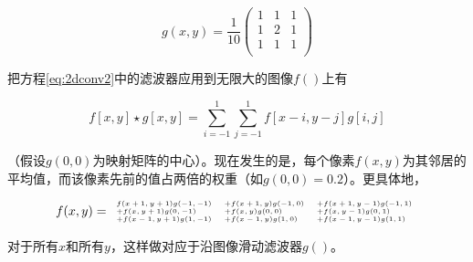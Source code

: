 \begin{equation}
g(x,y)=\frac{1}{10}
\left(
\begin{array}{ccc}
1 & 1 & 1\\
1 & 2 & 1\\
1 & 1 & 1\\
\end{array}
\right)
\end{equation}


把方程\ref{eq:2dconv2}中的滤波器应用到无限大的图像$f()$上有

\begin{equation}\label{eq:2dconv3}
f[x,y]\star g[x,y]=\sum_{i=-1}^{1}\sum_{j=-1}^{1}f[x-i,y-j]g[i,j]
\end{equation}

（假设$g(0,0)$为映射矩阵的中心）。现在发生的是，每个像素$f(x,y)$为其邻居的平均值，而该像素先前的值占两倍的权重（如$g(0,0)= 0.2$）。更具体地，

\begin{equation}
\tiny
f(x,y)=
\begin{array}{lll}
f(x+1,y+1)g(-1,-1) &+f(x+1,y)g(-1,0) &+f(x+1,y-1)g(-1,1)\\
+f(x,y+1)g(0,-1) &+f(x,y)g(0,0) &+f(x,y-1)g(0,1)\\
+f(x-1,y+1)g(1,-1) &+f(x-1,y)g(1,0) &+f(x-1,y-1)g(1,1)
\end{array}
\end{equation}


对于所有$x$和所有$y$，这样做对应于沿图像滑动滤波器$g()$。

